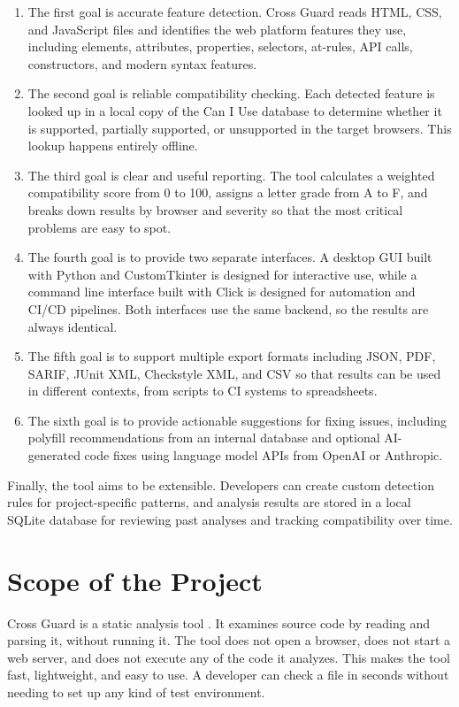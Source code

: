 \begin{enumerate}
    \item The first goal is accurate feature detection. Cross Guard reads HTML, CSS, and JavaScript files and identifies the web platform features they use, including elements, attributes, properties, selectors, at-rules, API calls, constructors, and modern syntax features.
    \item The second goal is reliable compatibility checking. Each detected feature is looked up in a local copy of the Can I Use database to determine whether it is supported, partially supported, or unsupported in the target browsers. This lookup happens entirely offline.
    \item The third goal is clear and useful reporting. The tool calculates a weighted compatibility score from 0 to 100, assigns a letter grade from A to F, and breaks down results by browser and severity so that the most critical problems are easy to spot.
    \item The fourth goal is to provide two separate interfaces. A desktop GUI built with Python and CustomTkinter is designed for interactive use, while a command line interface built with Click is designed for automation and CI/CD pipelines. Both interfaces use the same backend, so the results are always identical.
    \item The fifth goal is to support multiple export formats including JSON, PDF, SARIF, JUnit XML, Checkstyle XML, and CSV so that results can be used in different contexts, from scripts to CI systems to spreadsheets.
    \item The sixth goal is to provide actionable suggestions for fixing issues, including polyfill recommendations from an internal database and optional AI-generated code fixes using language model APIs from OpenAI or Anthropic.
\end{enumerate}

Finally, the tool aims to be extensible. Developers can create custom detection rules for project-specific patterns, and analysis results are stored in a local SQLite database for reviewing past analyses and tracking compatibility over time.

\section{Scope of the Project}
\label{sec:scope}

Cross Guard is a static analysis tool \cite{binkley2007sca}. It examines source code by reading and parsing it, without running it. The tool does not open a browser, does not start a web server, and does not execute any of the code it analyzes. This makes the tool fast, lightweight, and easy to use. A developer can check a file in seconds without needing to set up any kind of test environment.

